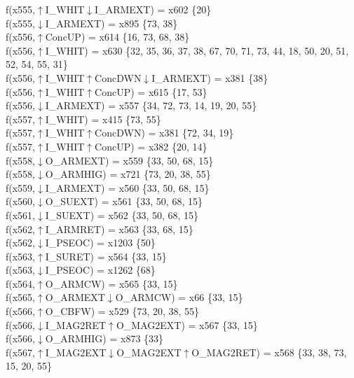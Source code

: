 f(x555,$\uparrow$I\_WHIT$\downarrow$I\_ARMEXT) = x602 \{20\} \\  
f(x555,$\downarrow$I\_ARMEXT) = x895 \{73, 38\} \\  
f(x556,$\uparrow$ConcUP) = x614 \{16, 73, 68, 38\} \\  
f(x556,$\uparrow$I\_WHIT) = x630 \{32, 35, 36, 37, 38, 67, 70, 71, 73, 44, 18, 50, 20, 51, 52, 54, 55, 31\} \\  
f(x556,$\uparrow$I\_WHIT$\uparrow$ConcDWN$\downarrow$I\_ARMEXT) = x381 \{38\} \\  
f(x556,$\uparrow$I\_WHIT$\uparrow$ConcUP) = x615 \{17, 53\} \\  
f(x556,$\downarrow$I\_ARMEXT) = x557 \{34, 72, 73, 14, 19, 20, 55\} \\  
f(x557,$\uparrow$I\_WHIT) = x415 \{73, 55\} \\  
f(x557,$\uparrow$I\_WHIT$\uparrow$ConcDWN) = x381 \{72, 34, 19\} \\  
f(x557,$\uparrow$I\_WHIT$\uparrow$ConcUP) = x382 \{20, 14\} \\  
f(x558,$\downarrow$O\_ARMEXT) = x559 \{33, 50, 68, 15\} \\  
f(x558,$\downarrow$O\_ARMHIG) = x721 \{73, 20, 38, 55\} \\  
f(x559,$\downarrow$I\_ARMEXT) = x560 \{33, 50, 68, 15\} \\  
f(x560,$\downarrow$O\_SUEXT) = x561 \{33, 50, 68, 15\} \\  
f(x561,$\downarrow$I\_SUEXT) = x562 \{33, 50, 68, 15\} \\  
f(x562,$\uparrow$I\_ARMRET) = x563 \{33, 68, 15\} \\  
f(x562,$\downarrow$I\_PSEOC) = x1203 \{50\} \\  
f(x563,$\uparrow$I\_SURET) = x564 \{33, 15\} \\  
f(x563,$\downarrow$I\_PSEOC) = x1262 \{68\} \\  
f(x564,$\uparrow$O\_ARMCW) = x565 \{33, 15\} \\  
f(x565,$\uparrow$O\_ARMEXT$\downarrow$O\_ARMCW) = x66 \{33, 15\} \\  
f(x566,$\uparrow$O\_CBFW) = x529 \{73, 20, 38, 55\} \\  
f(x566,$\downarrow$I\_MAG2RET$\uparrow$O\_MAG2EXT) = x567 \{33, 15\} \\  
f(x566,$\downarrow$O\_ARMHIG) = x873 \{33\} \\  
f(x567,$\uparrow$I\_MAG2EXT$\downarrow$O\_MAG2EXT$\uparrow$O\_MAG2RET) = x568 \{33, 38, 73, 15, 20, 55\} \\  
